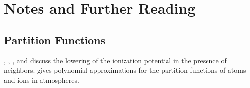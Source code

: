 \section{Notes and Further Reading}

\subsection{Partition Functions}

\citet[\S5-1 and \S9-4]{Mihalas-1978}, \citet[p.\@ 62--63]{Shu-1991}, \citet[p.\@
8--10]{Shu-1992},  and\citet{Hummer-1988} discuss the lowering of the ionization potential in the presence of neighbors.
\citet[appendix D]{Gray-1992} gives polynomial approximations for the partition functions of atoms and ions in atmospheres.

